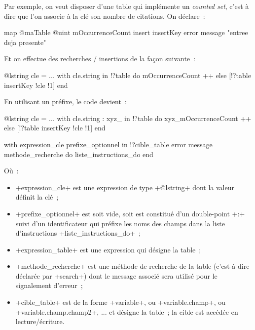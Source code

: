 Par exemple, on veut disposer d'une table qui implémente un \emph{counted set}, c'est à dire que l'on associe à la clé son nombre de citations. On déclare~:
\begin{galgas}
map @maTable {
  @uint mOccurrenceCount
  insert insertKey error message "entree deja presente"
}
\end{galgas}

Et on effectue des recherches / insertions de la façon suivante~:
\begin{galgas}
@lstring cle = ...
with cle.string in !?table do
  mOccurrenceCount ++
else
  [!?table insertKey !cle !1]
end
\end{galgas}

En utilisant un préfixe, le code devient~:
\begin{galgas}
@lstring cle = ...
with cle.string : xyz_ in !?table do
  xyz_mOccurrenceCount ++
else
  [!?table insertKey !cle !1]
end
\end{galgas}





\begin{galgas}
with expression_cle prefixe_optionnel in !?cible_table
error message methode_recherche
do
  liste_instructions_do
end
\end{galgas}

Où~:
\begin{itemize}
  \item \ggs+expression_cle+ est une expression de type \ggs+@lstring+ dont la valeur définit la clé~;
  \item \ggs+prefixe_optionnel+ est soit vide, soit est constitué d'un double-point \ggs+:+ suivi d'un identificateur qui préfixe les noms des champs dans la liste d'instructions \ggs+liste_instructions_do+~;
  \item \ggs+expression_table+ est une expression qui désigne la table~;
  \item \ggs+methode_recherche+ est une méthode de recherche de la table (c'est-à-dire déclarée par \ggs+search+) dont le message associé sera utilisé pour le signalement d'erreur~;
  \item \ggs+cible_table+ est de la forme \ggs+variable+, ou  \ggs+variable.champ+, ou \ggs+variable.champ.champ2+, ... et désigne la table~; la cible est accédée en lecture/écriture.
\end{itemize}

